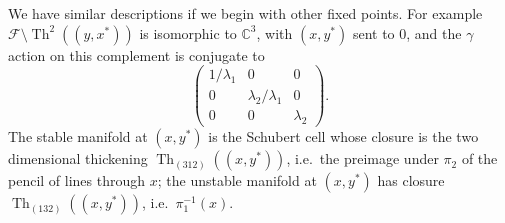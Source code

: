 \documentclass[12pt]{amsbook}%
\theoremstyle{definition}
\newtheorem{example}[thm]{Example}
\theoremstyle{remark}
\numberwithin{section}{chapter}
\numberwithin{subsection}{section}
\numberwithin{figure}{chapter}
\DeclareMathOperator{\SL}{SL}
\DeclareMathOperator{\PGL}{PGL}
\DeclareMathOperator{\Th}{Th}
\def\bC{{\mathbb{C}}}
\def\bP{{\mathbb{P}}}
\def\cF{{\mathscr{F}}}
\def\ga{\gamma}
\begin{document}
{{We have similar descriptions if we begin with other fixed points. For example $\cF\setminus\Th^2\left((y,x^{*})\right)$ is isomorphic to $\bC^3$, with $(x,y^{*})$ sent to $0$, and the $\ga$ action on this complement is conjugate to 
\[
\begin{pmatrix}
1/\lambda_1 & 0& 0\\ 0&\lambda_2/\lambda_1 &0\\ 0&0& \lambda_2
\end{pmatrix}.
\]
The stable manifold at $(x,y^{*})$ is the Schubert cell whose closure is the two dimensional thickening $\Th_{(312)}\left((x,y^{*})\right)$, i.e.\ the preimage under $\pi_2$ of the pencil of lines through $x$; the unstable manifold at $(x,y^{*})$ has closure $\Th_{(132)}\left((x,y^{*})\right)$, i.e.\ $\pi_1^{-1}(x)$. 














}}
\end{document}
